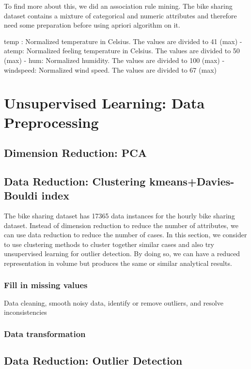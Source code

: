 \documentclass[12pt]{article}
\begin{document}
To find more about this, we did an association rule mining. The bike sharing dataset contains a mixture of categorical and numeric attributes and therefore need some preparation before using apriori algorithm on it.

temp : Normalized temperature in Celsius. The values are divided to 41 (max)
- atemp: Normalized feeling temperature in Celsius. The values are divided to 50 (max)
- hum: Normalized humidity. The values are divided to 100 (max)
- windspeed: Normalized wind speed. The values are divided to 67 (max)

\section{Unsupervised Learning: Data Preprocessing}
\subsection{Dimension Reduction: PCA }
\label{sec:dimension-reduction}

\subsection{Data Reduction: Clustering kmeans+Davies-Bouldi index}
\label{data-reduction}

The bike sharing dataset has  17365 data instances for the hourly bike sharing dataset. Instead of dimension reduction to reduce the number of attributes, we can use data reduction to reduce the number of cases. In this section, we consider to use clustering methods to cluster together similar cases and also try unsupervised learning for outlier detection. By doing so, we can have a reduced representation in volume but produces the same or similar analytical results.
\subsubsection{Fill in missing values}
Data cleaning, smooth noisy data, identify or remove outliers, and resolve inconsistencies
\subsubsection{Data transformation}

\subsection{Data Reduction: Outlier Detection}
\end{document}
